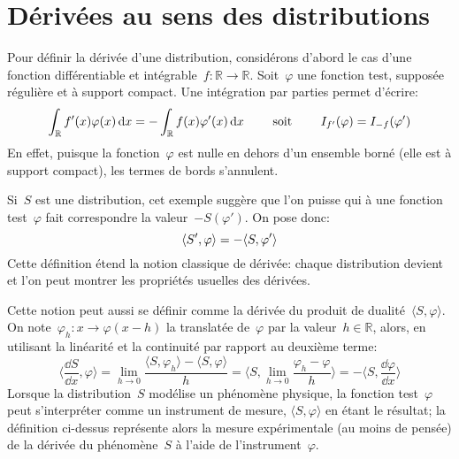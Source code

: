 \medskip
\section{Dérivées au sens des distributions}
Pour définir la dérivée d'une distribution, considérons d'abord le cas d'une fonction différentiable
et intégrable~$f:\mathbb{R}\rightarrow\mathbb{R}$.
Soit~$\varphi$ une fonction test, supposée régulière et à support compact.
Une intégration par parties permet d'écrire:
\begin{equation}
  \int_{\mathbb R} f'(x) \varphi(x)\,\text{d} x = -\int_{\mathbb R} f(x)\varphi'(x)\,\text{d} x \qquad\text{ soit }\qquad I_{f'}(\varphi)=I_{-f}(\varphi')
\end{equation}
En effet, puisque la fonction~$\varphi$ est nulle en dehors d'un ensemble borné (elle est à support
compact), les termes de bords s'annulent.

\medskip
\begin{definition}
Si~$S$ est une distribution, cet exemple suggère que l'on puisse  qui à une fonction test~$\varphi$ fait correspondre la valeur~$- S(\varphi')$.
On pose donc:
\begin{equation}\colorred
  \langle S', \varphi \rangle = - \langle S, \varphi' \rangle
\end{equation}
Cette définition étend la notion classique de dérivée:
chaque distribution devient  et l'on peut montrer les
propriétés usuelles des dérivées.
\end{definition}

\medskip
Cette notion peut aussi se définir comme la dérivée du produit de dualité~$\langle S,\varphi\rangle$.
On note~$\varphi_h:x\rightarrow\varphi(x-h)$ la translatée de~$\varphi$ par la valeur~$h\in{\mathbb R}$,
alors, en utilisant la linéarité et la continuité par rapport au deuxième terme:
\begin{equation}
\langle\frac{\dd S}{\dd x},\varphi\rangle= \lim_{h\rightarrow 0}\frac{ \langle S,\varphi_h\rangle- \langle S,\varphi\rangle}{h}
= \langle S,\lim_{h\rightarrow 0} \frac{\varphi_h-\varphi}{h} \rangle= -\langle S,\frac{\dd\varphi}{\dd x}\rangle
\end{equation}
Lorsque la distribution~$S$ modélise un phénomène physique, la fonction test~$\varphi$ peut
s'interpréter comme un instrument de mesure, $\langle S,\varphi\rangle$ en étant le résultat;
la définition ci-dessus représente alors la mesure expérimentale (au moins de pensée) de la
dérivée du phénomène~$S$ à l'aide de l'instrument~$\varphi$.

